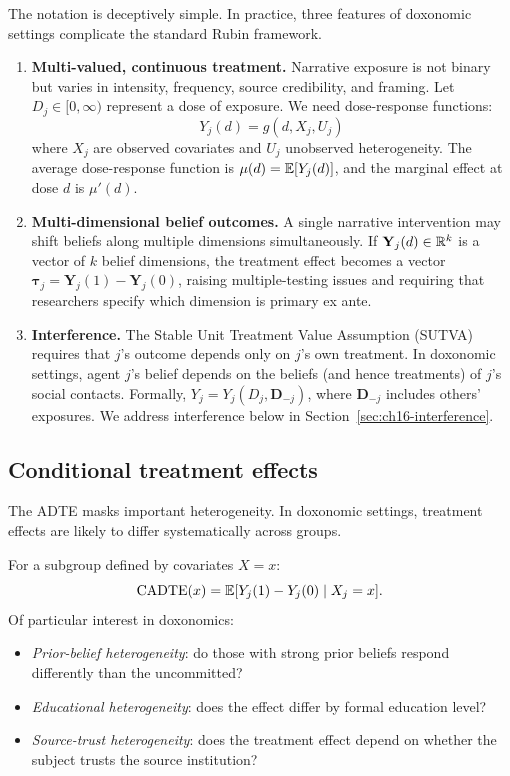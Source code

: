 The notation is deceptively simple.
In practice, three features of doxonomic settings complicate the standard Rubin framework.

\begin{enumerate}
  \item \textbf{Multi-valued, continuous treatment.}
  Narrative exposure is not binary but varies in intensity, frequency, source credibility, and framing.
  Let $D_j \in [0, \infty)$ represent a dose of exposure.
  We need dose-response functions:
  \[
    Y_j(d) = g(d, X_j, U_j)
  \]
  where $X_j$ are observed covariates and $U_j$ unobserved heterogeneity.
  The average dose-response function is $\mu(d) = \mathbb{E}[Y_j(d)]$, and the marginal effect at dose $d$ is $\mu'(d)$.

  \item \textbf{Multi-dimensional belief outcomes.}
  A single narrative intervention may shift beliefs along multiple dimensions simultaneously.
  If $\mathbf{Y}_j(d) \in \mathbb{R}^k$ is a vector of $k$ belief dimensions, the treatment effect becomes a vector $\boldsymbol{\tau}_j = \mathbf{Y}_j(1) - \mathbf{Y}_j(0)$, raising multiple-testing issues and requiring that researchers specify which dimension is primary ex ante.

  \item \textbf{Interference.}
  The Stable Unit Treatment Value Assumption (SUTVA) requires that $j$'s outcome depends only on $j$'s own treatment.
  In doxonomic settings, agent $j$'s belief depends on the beliefs (and hence treatments) of $j$'s social contacts.
  Formally, $Y_j = Y_j(D_j, \mathbf{D}_{-j})$, where $\mathbf{D}_{-j}$ includes others' exposures.
  We address interference below in Section~\ref{sec:ch16-interference}.
\end{enumerate}

\subsection{Conditional treatment effects}

The ADTE masks important heterogeneity.
In doxonomic settings, treatment effects are likely to differ systematically across groups.

\begin{definition}
\label{def:cate}
For a subgroup defined by covariates $X = x$:
\[
  \mathrm{CADTE}(x) = \mathbb{E}[Y_j(1) - Y_j(0) \mid X_j = x].
\]
Of particular interest in doxonomics:
\begin{itemize}[nosep]
  \item \emph{Prior-belief heterogeneity}: do those with strong prior beliefs respond differently than the uncommitted?
  \item \emph{Educational heterogeneity}: does the effect differ by formal education level?
  \item \emph{Source-trust heterogeneity}: does the treatment effect depend on whether the subject trusts the source institution?
\end{itemize}
\end{definition}

